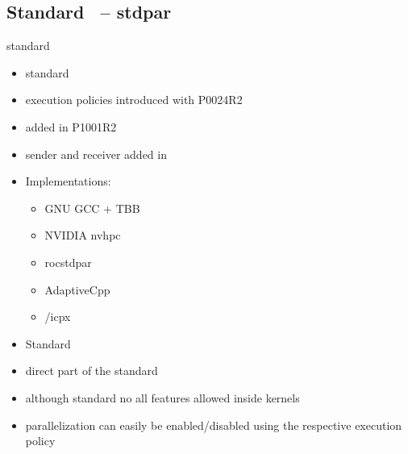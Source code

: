 \subsection{Standard \cpp\ -- stdpar}
\label{sec:frameworks:stdpar}

standard \cpp
\begin{itemize}
    \item {} standard~\cite{international_organization_for_standardization_isoiec_2017}
    \item execution policies introduced with  P0024R2~\cite{hoberock_p0024r2_2016}
    \item {} added in  P1001R2~\cite{meredith_p1001r2_2019}
    \item sender and receiver added in ~\cite{dominiak_p2300r10_2024, baker_p3396r0_2024, niebler_p3325r5_2024}
    \item Implementations:
    \begin{itemize}
        \item GNU GCC + TBB
        \item NVIDIA nvhpc
        \item rocstdpar
        \item AdaptiveCpp
        \item \dpcpp/icpx
    \end{itemize}
\end{itemize}


\begin{itemize}
    \item Standard \cpp
    \item direct part of the  standard
    \item although standard \cpp no all \cpp features allowed inside kernels
    \item parallelization can easily be enabled/disabled using the respective execution policy
\end{itemize}

